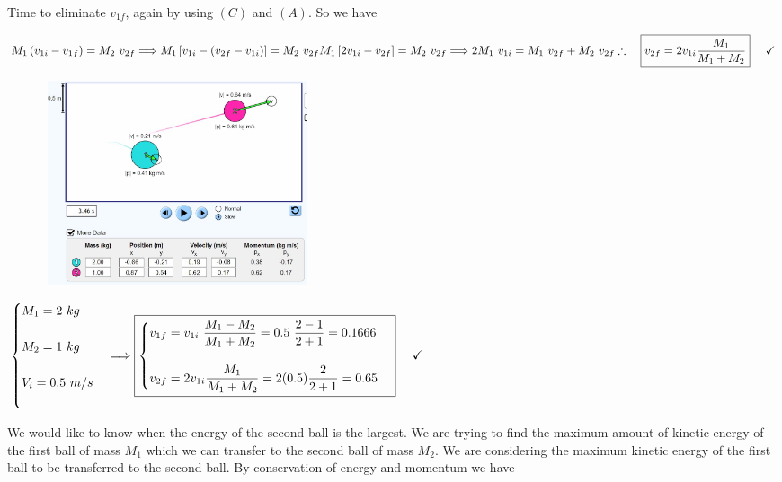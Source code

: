 \documentclass[fleqn]{article}
\begin{document}
Time to eliminate $v_{1f}$, again by using $(C)$ and $(A)$. So we have

$
  \\
  M_1\left(v_{1i}-v_{1f}\right)=M_2 ~ v_{2f} 
  \Longrightarrow  M_1 \left[v_{1i}-\left(v_{2f}-v_{1i}\right)\right]=M_2 ~ v_{2f}
  \\
  \\
  M_1 \left[2v_{1i}-v_{2f}\right]=M_2 ~ v_{2f} \Longrightarrow 2 M_1 ~ v_{1i}=M_1 ~ v_{2f}+M_2 ~ v_{2f}
  \\
  \\
  \\
  \therefore ~~~ \boxed{v_{2f}=2 v_{1i} \dfrac{M_1}{M_1+M_2}} ~~~~ \checkmark
  \\
  \\
$

\includegraphics[height=6cm, width=10cm]{14.JPG}

$
  \\
  \begin{cases}
    M_1=2 ~ kg
    \\
    \\
    M_2=1 ~ kg
    \\
    \\
    V_i=0.5 ~ m/s
    \\
    \\
  \end{cases} \Longrightarrow 
  \boxed{
    \begin{cases}
      v_{1f}=v_{1i} ~ \dfrac{M_1 - M_2}{M_1+M_2}
      =0.5 ~ \dfrac{2 - 1}{2+1}=0.1666
      \\
      \\
      v_{2f}=2 v_{1i} \dfrac{M_1}{M_1+M_2}
      =2 (0.5) \dfrac{2}{2+1}=0.65
    \end{cases}
  } ~~~~ \checkmark
$

\pagebreak

We would like to know when the energy of the second ball is the largest. We are trying to find the maximum amount 
of kinetic energy of the first ball of mass $M_1$ which we can transfer to the second ball of mass $M_2$. We are considering 
the maximum kinetic energy of the first ball to be transferred to the second ball. By conservation of energy and momentum we have
\end{document}
